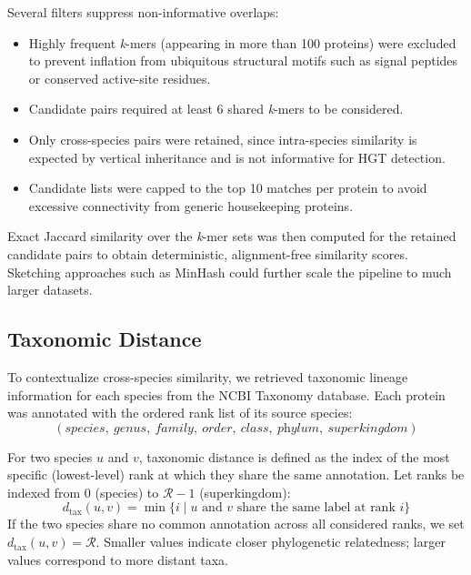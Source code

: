 \documentclass[11pt]{article}
\begin{document}
Several filters suppress non-informative overlaps:
\begin{itemize}[noitemsep]
    \item Highly frequent \textit{k}-mers (appearing in more than 100 proteins) were excluded to prevent inflation from ubiquitous structural motifs such as signal peptides or conserved active-site residues.
    \item Candidate pairs required at least 6 shared \textit{k}-mers to be considered.
    \item Only cross-species pairs were retained, since intra-species similarity is expected by vertical inheritance and is not informative for HGT detection.
    \item Candidate lists were capped to the top 10 matches per protein to avoid excessive connectivity from generic housekeeping proteins.
\end{itemize}

Exact Jaccard similarity over the \textit{k}-mer sets was then computed for the retained candidate pairs to obtain deterministic, alignment-free similarity scores. Sketching approaches such as MinHash could further scale the pipeline to much larger datasets\cite{Broder1997,Ondov2016}.

\subsection{Taxonomic Distance}
\label{subsec:taxdist}

To contextualize cross-species similarity, we retrieved taxonomic lineage information for each species from the NCBI Taxonomy database\cite{NCBITaxonomy}. Each protein was annotated with the ordered rank list of its source species:
\[
(\textit{species},\ \textit{genus},\ \textit{family},\ \textit{order},\ \textit{class},\ \textit{phylum},\ \textit{superkingdom})
\]

For two species $u$ and $v$, taxonomic distance is defined as the index of the most specific (lowest-level) rank at which they share the same annotation. Let ranks be indexed from 0 (species) to $\mathcal{R}-1$ (superkingdom):
\begin{equation}
d_{\mathrm{tax}}(u,v) = \min\bigl\{ i \;\big|\; u \text{ and } v \text{ share the same label at rank } i \bigr\}
\end{equation}
If the two species share no common annotation across all considered ranks, we set $d_{\mathrm{tax}}(u,v) = \mathcal{R}$. Smaller values indicate closer phylogenetic relatedness; larger values correspond to more distant taxa.
\end{document}
